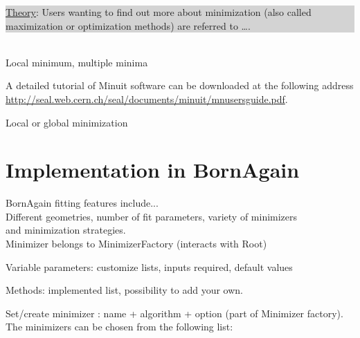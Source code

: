 \noindent \smallpencil \colorbox{Lightgray}{\parbox{\dimexpr\linewidth-8\fboxsep}
{\underline{Theory}: Users wanting to find out more about minimization (also called
maximization or optimization methods) are referred to \ldots.}}\\


Local minimum, multiple minima




A detailed tutorial of Minuit software can be downloaded at the
following address \url{http://seal.web.cern.ch/seal/documents/minuit/mnusersguide.pdf}.

Local or global minimization
\section{Implementation in BornAgain}
BornAgain fitting features include...\\
Different geometries, number of fit parameters, variety of minimizers\\
and minimization strategies.\\

Minimizer belongs to MinimizerFactory (interacts with Root)

Variable parameters: customize lists, inputs required, default values

Methods: implemented list, possibility to add your own.

Set/create minimizer : name + algorithm + option (part of Minimizer
factory). The minimizers can be chosen from the following list:

